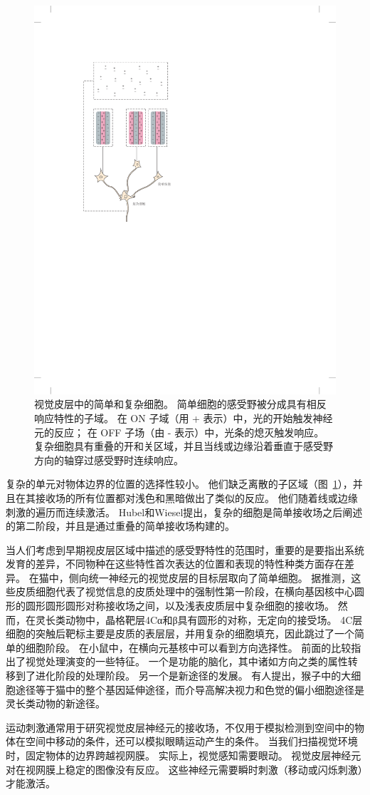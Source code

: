 \begin{figure}[htbp]
	\centering
	\includegraphics[width=0.5\linewidth]{chap23/fig_23_4}
	\caption{视觉皮层中的简单和复杂细胞。
		简单细胞的感受野被分成具有相反响应特性的子域。
		在 ON 子域（用 + 表示）中，光的开始触发神经元的反应；
		在 OFF 子场（由 - 表示）中，光条的熄灭触发响应。
		复杂细胞具有重叠的开和关区域，并且当线或边缘沿着垂直于感受野方向的轴穿过感受野时连续响应。}
	\label{fig:23_4}
\end{figure}


复杂的单元对物体边界的位置的选择性较小。
他们缺乏离散的子区域（图~\ref{fig:23_4}），并且在其接收场的所有位置都对浅色和黑暗做出了类似的反应。
他们随着线或边缘刺激的遍历而连续激活。
Hubel和Wiesel提出，复杂的细胞是简单接收场之后阐述的第二阶段，并且是通过重叠的简单接收场构建的。


当人们考虑到早期视皮层区域中描述的感受野特性的范围时，重要的是要指出系统发育的差异，不同物种在这些特性首次表达的位置和表现的特性种类方面存在差异。
在猫中，侧向统一神经元的视觉皮层的目标层取向了简单细胞。
据推测，这些皮质细胞代表了视觉信息的皮质处理中的强制性第一阶段，在横向基因核中心圆形的圆形圆形圆形对称接收场之间，以及浅表皮质层中复杂细胞的接收场。
然而，在灵长类动物中，晶格靶层4Cα和β具有圆形的对称，无定向的接受场。
4C层细胞的突触后靶标主要是皮质的表层层，并用复杂的细胞填充，因此跳过了一个简单的细胞阶段。
在小鼠中，在横向元基核中可以看到方向选择性。
前面的比较指出了视觉处理演变的一些特征。
一个是功能的脑化，其中诸如方向之类的属性转移到了进化阶段的处理阶段。
另一个是新途径的发展。
有人提出，猴子中的大细胞途径等于猫中的整个基因延伸途径，而介导高解决视力和色觉的偏小细胞途径是灵长类动物的新途径。


运动刺激通常用于研究视觉皮层神经元的接收场，不仅用于模拟检测到空间中的物体在空间中移动的条件，还可以模拟眼睛运动产生的条件。
当我们扫描视觉环境时，固定物体的边界跨越视网膜。
实际上，视觉感知需要眼动。
视觉皮层神经元对在视网膜上稳定的图像没有反应。
这些神经元需要瞬时刺激（移动或闪烁刺激）才能激活。


